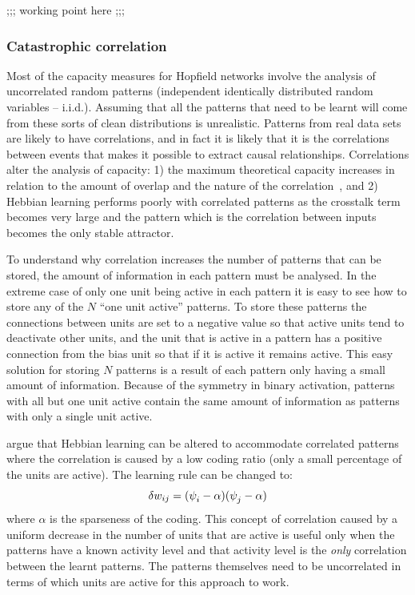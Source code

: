 ;;; working point here ;;;

\subsubsection{Catastrophic correlation}
\label{sec:CatastrophicCorrelation}


Most of the capacity measures for Hopfield networks involve the analysis of uncorrelated random patterns (independent identically distributed random variables -- i.i.d.).  Assuming that all the patterns that need to be learnt will come from these sorts of clean distributions is unrealistic.  Patterns from real data sets are likely to have correlations, and in fact it is likely that it is the correlations between events that makes it possible to extract causal relationships.  Correlations alter the analysis of capacity: 1) the maximum theoretical capacity increases in relation to the amount of overlap and the nature of the correlation~\citep{Gardner1988, Lowe1998, Gandolfo1999, Kimoto2002, Bogacz2003}, and 2) Hebbian learning performs poorly with correlated patterns as the crosstalk term becomes very large and the pattern which is the correlation between inputs becomes the only stable attractor.

To understand why correlation increases the number of patterns that can be stored, the amount of information in each pattern must be analysed.  In the extreme case of only one unit being active in each pattern it is easy to see how to store any of the $N$ ``one unit active'' patterns.  To store these patterns the connections between units are set to a negative value so that active units tend to deactivate other units, and the unit that is active in a pattern has a positive connection from the bias unit so that if it is active it remains active.  This easy solution for storing $N$ patterns is a result of each pattern only having a small amount of information.  Because of the symmetry in binary activation, patterns with all but one unit active contain the same amount of information as patterns with only a single unit active.  

\citet{Amit1987b} argue that Hebbian learning can be altered to accommodate correlated patterns where the correlation is caused by a low coding ratio (only a small percentage of the units are active).  The learning rule can be changed to:
\begin{equation}
	\label{eq:HebbianlearningCorrellated}
	\delta w_{ij} = (\psi_{i}^{}-\alpha)(\psi_{j}^{}-\alpha)
\end{equation}
where $\alpha$ is the sparseness of the coding.  This concept of correlation caused by a uniform decrease in the number of units that are active is useful only when the patterns have a known activity level and that activity level is the {\em only} correlation between the learnt patterns.  The patterns themselves need to be uncorrelated in terms of which units are active for this approach to work.

